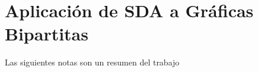 \documentclass[14pt]{article}
\begin{document}
\section*{Aplicación de SDA a Gráficas Bipartitas}

Las siguientes notas son un resumen del trabajo 
\end{document}
